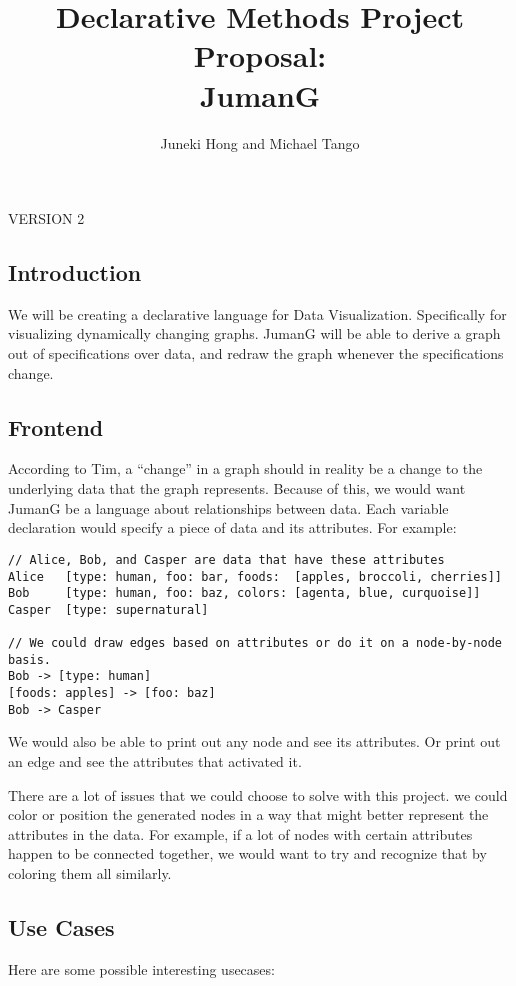 \documentclass{article}
\author{Juneki Hong and Michael Tango}
\title{Declarative Methods Project Proposal: \\ JumanG}
\begin{document}
\maketitle


VERSION 2


\newpage

\subsection*{Introduction}

We will be creating a declarative language for Data Visualization. Specifically for visualizing dynamically changing graphs.
JumanG will be able to derive a graph out of specifications over data, and redraw the graph whenever the specifications change.



\subsection*{Frontend}

According to Tim, a “change” in a graph should in reality be a change to the underlying data that the graph represents. Because of this, we would want JumanG be a language about relationships between data. Each variable declaration would specify a piece of data and its attributes. For example:

\begin{verbatim}
// Alice, Bob, and Casper are data that have these attributes
Alice   [type: human, foo: bar, foods:  [apples, broccoli, cherries]] 
Bob     [type: human, foo: baz, colors: [agenta, blue, curquoise]]
Casper  [type: supernatural]

// We could draw edges based on attributes or do it on a node-by-node basis.
Bob -> [type: human]
[foods: apples] -> [foo: baz]
Bob -> Casper
\end{verbatim}
We would also be able to print out any node and see its attributes. Or print out an edge and see the attributes that activated it.

There are a lot of issues that we could choose to solve with this project. we could color or position the generated nodes in a way that might better represent the attributes in the data. For example, if a lot of nodes with certain attributes happen to be connected together, we would want to try and recognize that by coloring them all similarly.

\subsection*{Use Cases}
Here are some possible interesting usecases:
\end{document}

